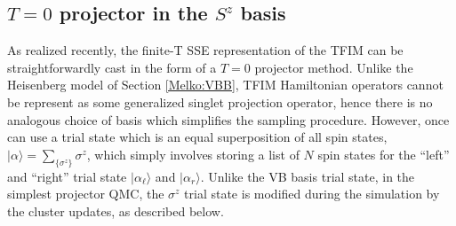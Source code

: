 \documentclass[vecphys]{svmult}
\begin{document}
\subsection{$T=0$ projector in the $S^z$ basis} \label{Melko:zeroTFIMsec}

As realized recently\cite{Melko:unpub}, the finite-T SSE representation of the TFIM can be straightforwardly cast in the form of a $T=0$ projector method.  Unlike the Heisenberg model of Section \ref{Melko:VBB}, TFIM Hamiltonian operators cannot be represent as some generalized singlet projection operator, hence there is no analogous choice of basis which simplifies the sampling procedure.  However, once can use a trial state which is an equal superposition of all spin states, $| \alpha \rangle = \sum_{\{ \sigma^z \}} \sigma^z$, which simply involves storing a list of $N$ spin states for the ``left'' and ``right'' trial state $| \alpha_{\ell}\rangle$ and $| \alpha_r \rangle$.  Unlike the VB basis trial state, in the simplest projector QMC, the $\sigma^z$ trial state is modified during the simulation by the cluster updates, as described below.
\end{document}
